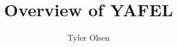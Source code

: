 \documentclass[11pt]{article}
\begin{document}
\title{Overview of YAFEL}
\author{Tyler Olsen}
\maketitle





\end{document}
